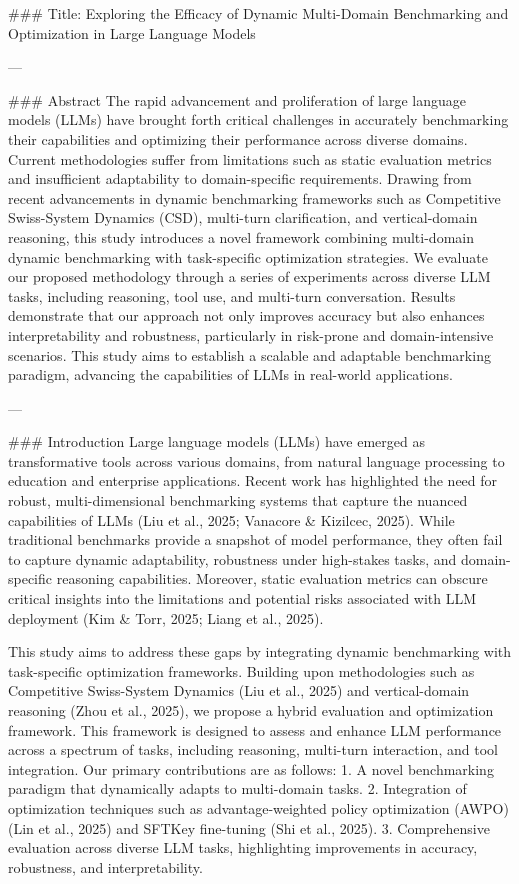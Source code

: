 ### Title: Exploring the Efficacy of Dynamic Multi-Domain Benchmarking and Optimization in Large Language Models

---

### Abstract  
The rapid advancement and proliferation of large language models (LLMs) have brought forth critical challenges in accurately benchmarking their capabilities and optimizing their performance across diverse domains. Current methodologies suffer from limitations such as static evaluation metrics and insufficient adaptability to domain-specific requirements. Drawing from recent advancements in dynamic benchmarking frameworks such as Competitive Swiss-System Dynamics (CSD), multi-turn clarification, and vertical-domain reasoning, this study introduces a novel framework combining multi-domain dynamic benchmarking with task-specific optimization strategies. We evaluate our proposed methodology through a series of experiments across diverse LLM tasks, including reasoning, tool use, and multi-turn conversation. Results demonstrate that our approach not only improves accuracy but also enhances interpretability and robustness, particularly in risk-prone and domain-intensive scenarios. This study aims to establish a scalable and adaptable benchmarking paradigm, advancing the capabilities of LLMs in real-world applications.

---

### Introduction  
Large language models (LLMs) have emerged as transformative tools across various domains, from natural language processing to education and enterprise applications. Recent work has highlighted the need for robust, multi-dimensional benchmarking systems that capture the nuanced capabilities of LLMs (Liu et al., 2025; Vanacore & Kizilcec, 2025). While traditional benchmarks provide a snapshot of model performance, they often fail to capture dynamic adaptability, robustness under high-stakes tasks, and domain-specific reasoning capabilities. Moreover, static evaluation metrics can obscure critical insights into the limitations and potential risks associated with LLM deployment (Kim & Torr, 2025; Liang et al., 2025).

This study aims to address these gaps by integrating dynamic benchmarking with task-specific optimization frameworks. Building upon methodologies such as Competitive Swiss-System Dynamics (Liu et al., 2025) and vertical-domain reasoning (Zhou et al., 2025), we propose a hybrid evaluation and optimization framework. This framework is designed to assess and enhance LLM performance across a spectrum of tasks, including reasoning, multi-turn interaction, and tool integration. Our primary contributions are as follows:
1. A novel benchmarking paradigm that dynamically adapts to multi-domain tasks.
2. Integration of optimization techniques such as advantage-weighted policy optimization (AWPO) (Lin et al., 2025) and SFTKey fine-tuning (Shi et al., 2025).
3. Comprehensive evaluation across diverse LLM tasks, highlighting improvements in accuracy, robustness, and interpretability.

